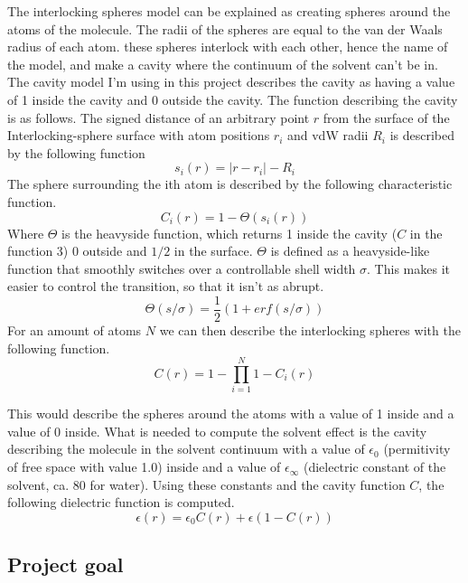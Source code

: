 \documentclass[a4paper,11pt]{article}
\begin{document}
The interlocking spheres model can be explained as creating spheres
around the atoms of the molecule. The radii of the spheres are equal
to the van der Waals radius of each atom. these spheres interlock with
each other, hence the name of the model, and make a cavity where the
continuum of the solvent can't be in.  The cavity model I'm using in
this project describes the cavity as having a value of 1 inside the
cavity and 0 outside the cavity. The function describing the cavity is
as follows.  The signed distance of an arbitrary point $r$ from the
surface of the Interlocking-sphere surface with atom positions $r_i$
and \ac{vdW} radii $R_i$ is described by the following function
\begin{equation}
s_i(r) = \vert r - r_i\vert - R_i
\end{equation}
The sphere surrounding the ith atom is described by the following characteristic function.
\begin{equation}
C_i(r) = 1 - \Theta (s_i(r)) 
\end{equation}
Where $\Theta$ is the heavyside function, which returns 1 inside the
cavity ($C$ in the function 3) 0 outside and $1/2$ in the
surface. $\Theta$ is defined as a heavyside-like function that
smoothly switches over a controllable shell width $\sigma$. This makes
it easier to control the transition, so that it isn't as abrupt.
\begin{equation}
\Theta (s/\sigma) = \frac{1}{2} (1 + erf(s/\sigma))
\end{equation}
For an amount of atoms $N$ we can then describe the interlocking spheres with the following function.
\begin{equation}
C(r) = 1 - \prod_{i=1}^{N} 1 - C_i (r)
\end{equation}

This would describe the spheres around the atoms with a value of 1
inside and a value of 0 inside. What is needed to compute the solvent
effect is the cavity describing the molecule in the solvent continuum
with a value of $\epsilon_0$ (permitivity of free space with value
1.0) inside and a value of $\epsilon_\infty$ (dielectric constant of
the solvent, ca. 80 for water). Using these constants and the cavity
function $C$, the following dielectric function is computed.
\begin{equation}
\epsilon (r) = \epsilon_0 C(r) + \epsilon (1 - C(r))
\end{equation}


\subsection{Project goal}
\end{document}
